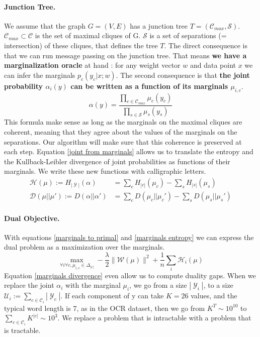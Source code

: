 \documentclass{article}
\DeclareMathOperator{\1}{\mathbb{1}}
\DeclareMathOperator{\Y}{\mathcal{Y}}
\begin{document}
\paragraph{Junction Tree.}
We assume that the graph $G=(V,E)$ has a junction tree $T=(\mathcal C_{max},\mathcal{S})$.
$\mathcal C_{max} \subset \mathcal C $ is the set of maximal cliques of G.
$\mathcal S$ is a set of separations (= intersection) of these cliques, that defines the tree $T$.
The direct consequence is that we can run message passing on the junction tree.
That means \textbf{we have a marginalization oracle} at hand : for any weight vector $w$ and data point $x$ we can infer the marginals $p_c(y_c |x ; w)$.
The second consequence is that \textbf{the joint probability $\alpha_i(y)$ can be written as a function of its marginals $\mu_{i, c}$}.
\begin{equation}
	\label{joint from marginals}
	\alpha(y) = \frac{\prod_{c\in\mathcal{C}_{max}} \mu_c(y_c)}{\prod_{s\in\mathcal{S}} \mu_s(y_s)}
\end{equation}
This formula make sense as long as the marginals on the maximal cliques are coherent, meaning that they agree about the values of the marginals on the separations.
Our algorithm will make sure that this coherence is preserved at each step.
Equation \ref{joint from marginals} allows us to translate the entropy and the Kullback-Leibler divergence of joint probabilities as functions of their marginals. We write these new functions with calligraphic letters.
\begin{align}
	\label{marginals entropy}
	\mathcal H (\mu) := H_{|\Y|} (\alpha) & = \sum_c H_{|c|}(\mu_c) - \sum_s H_{|s|}(\mu_s) \\
	\label{marginals divergence}
	\mathcal D (\mu||\mu') := D(\alpha||\alpha') & = \sum_c D(\mu_c||\mu_c') - \sum_s D(\mu_s||\mu_s')
\end{align}


\paragraph{Dual Objective.}
With equations \ref{marginals to primal} and \ref{marginals entropy} we can express the dual problem as a maximization over the marginals.
\begin{equation}
	\max_{\forall i \forall c, \mu_{i, c} \in \Delta_{|c|} } - \frac{\lambda}{2} \| \mathcal W(\mu)\|^2 + \frac{1}{n} \sum_i \mathcal H _ i(\mu)
\end{equation}
Equation \ref{marginals divergence} even allow us to compute duality gaps.
When we replace the joint $\alpha_i$ with the marginal $\mu_i$, we go from a size $|\Y_i|$, to a size $\mathcal U_i := \sum_{c \in \mathcal C_i} |\Y_c|$.
If each component of y can take $K=26$ values, and the typical word length is 7, as in the OCR dataset, then we go from $K^T \sim 10^{10}$ to $\sum_{c \in \mathcal C_i} K^{|c|} \sim 10^3$.
We replace a problem that is intractable with a problem that is tractable.
\end{document}
